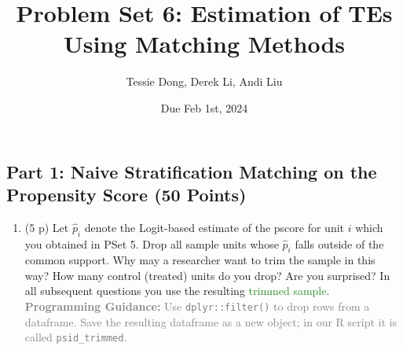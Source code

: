 \documentclass[
]{article}
\title{Problem Set 6: Estimation of TEs Using Matching Methods}
\author{Tessie Dong, Derek Li, Andi Liu}
\date{Due Feb 1st, 2024}
\providecommand{\tightlist}{%
  \setlength{\itemsep}{0pt}\setlength{\parskip}{0pt}}
\begin{document}
\maketitle



\newpage

\subsection{Part 1: Naive Stratification Matching on the Propensity
Score (50
Points)}\label{part-1-naive-stratification-matching-on-the-propensity-score-50-points}



\begin{enumerate}
\def\labelenumi{\arabic{enumi}.}
\tightlist
\item
  (5 p) Let \(\widehat{p}_i\) denote the Logit-based estimate of the
  pscore for unit \(i\) which you obtained in PSet 5. Drop all sample
  units whose \(\widehat{p}_{i}\) falls outside of the common support.
  Why may a researcher want to trim the sample in this way? How many
  control (treated) units do you drop? Are you surprised? In all
  subsequent questions you use the resulting
  \textcolor{ForestGreen}{trimmed sample}.
  \textcolor{gray}{\textbf{Programming Guidance:} Use \texttt{dplyr::filter()} to drop rows from a dataframe. Save the resulting dataframe as a new object; in our R script it is called \texttt{psid\_trimmed}.}\label{item:pscore-trim}
\end{enumerate}
\end{document}
